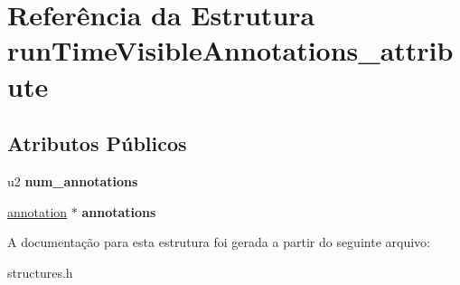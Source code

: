 \hypertarget{structrunTimeVisibleAnnotations__attribute}{}\section{Referência da Estrutura run\+Time\+Visible\+Annotations\+\_\+attribute}
\label{structrunTimeVisibleAnnotations__attribute}
\subsection*{Atributos Públicos}
\begin{DoxyCompactItemize}
\item 
\mbox{\label{structrunTimeVisibleAnnotations__attribute_a1b180c3313acd68fb6956135bad01345}} 
u2 {\bfseries num\+\_\+annotations}
\item 
\mbox{\label{structrunTimeVisibleAnnotations__attribute_a26ee34fb2f6d38aa18cd692099fe0e40}} 
\hyperlink{structannotation}{annotation} $\ast$ {\bfseries annotations}
\end{DoxyCompactItemize}


A documentação para esta estrutura foi gerada a partir do seguinte arquivo\+:\begin{DoxyCompactItemize}
\item 
structures.\+h\end{DoxyCompactItemize}
